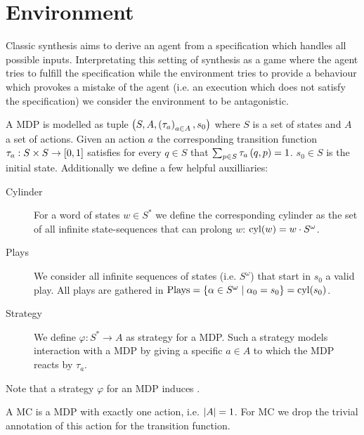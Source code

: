 \chapter{Environment}
Classic synthesis aims to derive an agent from a specification which handles
all possible inputs. Interpretating this setting of synthesis as a game where
the agent tries to fulfill the specification while the environment tries to
provide a behaviour which provokes a mistake of the agent (i.e. an execution
which does not satisfy the specification) we consider the environment to be
antagonistic.
\begin{definition}
  A \acl*{MDP} is modelled as tuple
  $\left(S, A, \left(\tau_{a}\right)_{a\in A}, s_{0}\right)$ where $S$ is a set of states
  and $A$ a set of actions. Given an action $a$ the corresponding transition
  function $\tau_{a}:S\times S\rightarrow \left[0,1\right]$ satisfies for every
  $q\in S$ that $\sum_{p\in S}\tau_{a}\left(q,p\right) = 1$. $s_{0}\in S$ is the
  initial state. Additionally we define a few helpful auxilliaries:
  \begin{description}
    \item [Cylinder] For a word of states $w\in S^{*}$ we define the
      corresponding cylinder as the set of all infinite state-sequences
      that can prolong $w$: $\operatorname{cyl}(w) = w\cdot S^{\omega}$.
    \item [Plays] We consider all infinite sequences of states
      (i.e. $S^{\omega}$) that start in $s_{0}$ a valid play. All plays
      are gathered in $\operatorname{Plays} = \left\{
        \alpha\in S^{\omega}\mid \alpha_{0} = s_{0}\right\} = \operatorname{cyl}(s_{0})$.
    \item [Strategy] We define $\varphi:S^{*}\rightarrow A$ as strategy for
      a \ac{MDP}. Such a strategy models interaction with a \ac{MDP} by
      giving a specific $a\in A$ to which the \ac{MDP} reacts by $\tau_{a}$.
  \end{description}
\end{definition}
Note that a strategy $\varphi$ for an \ac{MDP} induces .
\begin{definition}
  A \ac{MC} is a \ac{MDP} with exactly one action, i.e. $\left\vert{A}\right\vert = 1$. For \ac{MC}
  we drop the trivial annotation of this action for the transition function.
\end{definition}
